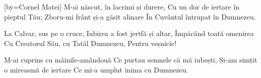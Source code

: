 [by={Cornel Matei}]
\beginverse
M-ai născut, în lacrimi și durere,
Cu un dor de iertare în pieptul Tău;
Zboru-mi frânt și-a găsit alinare
În Cuvântul întrupat în Dumnezeu.
\endverse

\beginchorus
La Calvar, sus pe o cruce,
Iubirea a fost jertfă și altar,
Împăcând toată omenirea
Cu Creatorul Său, cu Tatăl Dumnezeu,
Pentru veșnicie!
\endchorus

\beginverse
M-ai cuprins cu mâinile-amândouă
Ce purtau semnele că mă iubești,
Și-am simțit o mireasmă de iertare
Ce mi-a umplut inima cu Dumnezeu.
\endverse
\endsong